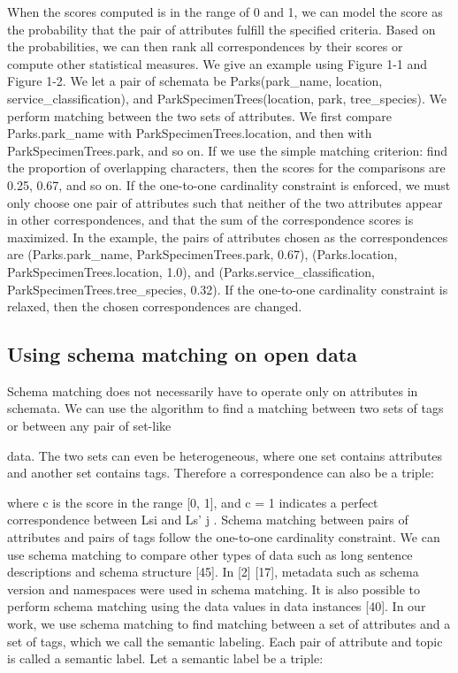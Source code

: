 When the scores computed is in the range of 0 and 1, we can model the score as the probability that the pair of attributes fulfill the specified criteria. Based on the probabilities, we can then rank all correspondences by their scores or compute other statistical measures.
We give an example using Figure 1-1 and Figure 1-2. We let a pair of schemata be
Parks(park\_name, location, service\_classification), and
ParkSpecimenTrees(location, park, tree\_species).
We perform matching between the two sets of attributes. We first compare Parks.park\_name with ParkSpecimenTrees.location, and then with ParkSpecimenTrees.park, and so on. If we use the simple matching criterion: find the proportion of overlapping characters, then the scores for the comparisons are 0.25, 0.67, and so on. If the one-to-one cardinality constraint is enforced, we must only choose one pair of attributes such that neither of the two attributes appear in other correspondences, and that the sum of the correspondence scores is maximized. In the example, the pairs of attributes chosen as the correspondences are
(Parks.park\_name, ParkSpecimenTrees.park, 0.67),
(Parks.location, ParkSpecimenTrees.location, 1.0), and
(Parks.service\_classification, ParkSpecimenTrees.tree\_species, 0.32).
If the one-to-one cardinality constraint is relaxed, then the chosen correspondences are changed.

\subsection{Using schema matching on open data}
\label{ssec:UsingSchemaMatchingOnOpenData}

Schema matching does not necessarily have to operate only on attributes in schemata. We can use the algorithm to find a matching between two sets of tags or between any pair of set-like

data. The two sets can even be heterogeneous, where one set contains attributes and another set contains tags.
Therefore a correspondence can also be a triple:

where c is the score in the range [0, 1], and c = 1 indicates a perfect correspondence between Lsi and Ls' j . Schema matching between pairs of attributes and pairs of tags follow the one-to-one cardinality constraint.
We can use schema matching to compare other types of data such as long sentence descriptions and schema structure [45]. In [2] [17], metadata such as schema version and namespaces were used in schema matching. It is also possible to perform schema matching using the data values in data instances [40]. In our work, we use schema matching to find matching between a set of attributes and a set of tags, which we call the semantic labeling. Each pair of attribute and topic is called a semantic label.
Let a semantic label be a triple:

